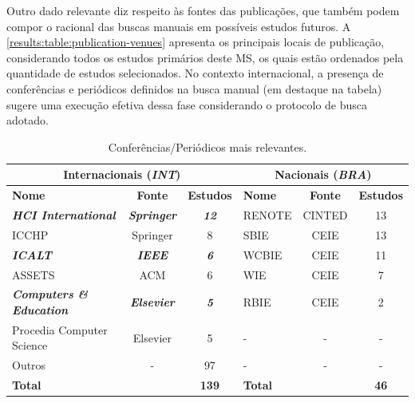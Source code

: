 
Outro dado relevante diz respeito às fontes das publicações, que também podem compor o racional das buscas manuais em possíveis estudos futuros. A \autoref{results:table:publication-venues} apresenta os principais locais de publicação, considerando todos os estudos primários deste MS, os quais estão ordenados pela quantidade de estudos selecionados. No contexto internacional, a presença de conferências e periódicos definidos na busca manual (em destaque na tabela) sugere uma execução efetiva dessa fase considerando o protocolo de busca adotado.

\begin{table}[htbp]
\caption{Conferências/Periódicos mais relevantes.}
\label{results:table:publication-venues}
\centering
\begin{tabular}{lcc|lcc}
\hline
\multicolumn{3}{c|}{\textbf{Internacionais (\textit{INT})}} & \multicolumn{3}{c}{\textbf{Nacionais (\textit{BRA})}} \\ \hline
\textbf{Nome} & \textbf{Fonte} & \textbf{Estudos} & \textbf{Nome} & \textbf{Fonte} & \textbf{Estudos} \\ \hline
\textit{\textbf{HCI International}} & \textit{\textbf{Springer}} & \textit{\textbf{12}} & RENOTE & CINTED & 13 \\ 
ICCHP & Springer & 8 & SBIE & CEIE & 13 \\ 
\textit{\textbf{ICALT}} & \textit{\textbf{IEEE}} & \textit{\textbf{6}} & WCBIE & CEIE & 11 \\ 
ASSETS & ACM & 6 & WIE & CEIE & 7 \\ 
\textit{\textbf{Computers \& Education}} & \textit{\textbf{Elsevier}} & \textit{\textbf{5}} & RBIE & CEIE & 2 \\ 
Procedia Computer Science & Elsevier & 5 & - & - & - \\ 
Outros & - & 97 & - & - & - \\ 
\multicolumn{2}{l}{\textbf{Total}} & \textbf{139} & \multicolumn{2}{l}{\textbf{Total}} & \textbf{46} \\ \hline
\end{tabular}
\fautor
\end{table}

